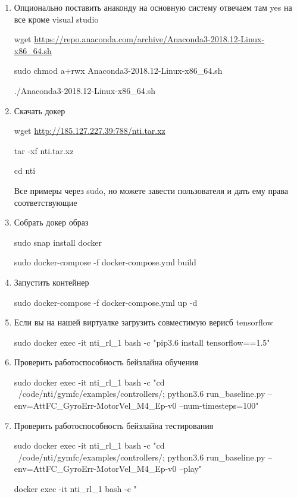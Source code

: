 \begin{enumerate}
    \item Опционально поставить анаконду на основную систему отвечаем там yes на все кроме visual studio
    
    wget \url{https://repo.anaconda.com/archive/Anaconda3-2018.12-Linux-x86_64.sh}
    
    sudo chmod a+rwx Anaconda3-2018.12-Linux-x86\_64.sh
    
    ./Anaconda3-2018.12-Linux-x86\_64.sh
    
    \item Скачать докер
    
    wget \url{http://185.127.227.39:788/nti.tar.xz}

    tar -xf nti.tar.xz

    cd nti

    Все примеры через sudo, но можете завести пользователя и дать ему права соответствующие

    \item Собрать докер образ
    
    sudo snap install docker

    sudo docker-compose  -f docker-compose.yml build

    \item Запустить контейнер

    sudo docker-compose -f docker-compose.yml up -d 

    \item Если вы на нашей виртуалке загрузить совместимую верисб tensorflow

    sudo docker exec -it nti\_rl\_1 bash -c "pip3.6 install tensorflow==1.5"
    
    \item Проверить работоспособность бейзлайна обучения

    sudo docker exec -it nti\_rl\_1 bash -c "cd ~/code/nti/gymfc/examples/controllers/; python3.6 run\_baseline.py --env=AttFC\_GyroErr-MotorVel\_M4\_Ep-v0 --num-timesteps=100"  

    \item Проверить работоспособность бейзлайна тестирования

    sudo docker exec -it nti\_rl\_1 bash -c "cd ~/code/nti/gymfc/examples/controllers/; python3.6 run\_baseline.py --env=AttFC\_GyroErr-MotorVel\_M4\_Ep-v0 --play"
    
    docker exec -it nti\_rl\_1 bash -c "

    

    
\end{enumerate}



